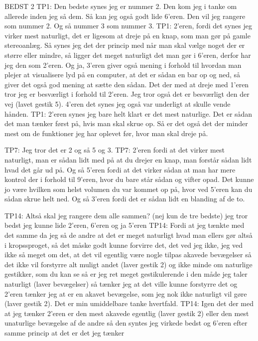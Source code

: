 BEDST 2
TP1: Den bedste synes jeg er nummer 2. Den kom jeg i tanke om allerede inden jeg så dem. Så kan jeg også godt lide 6’eren. Den vil jeg rangere som nummer 2. Og så nummer 3 som nummer 3.
TP1: 2’eren, fordi det synes jeg virker mest naturligt, det er ligesom at dreje på en knap, som man gør på gamle stereoanlæg. Så synes jeg det der princip med når man skal vælge noget der er større eller mindre, så ligger det meget naturligt det man gør i 6’eren, derfor har jeg den som 2’eren. Og ja, 3’eren giver også mening i forhold til hvordan man plejer at visualisere lyd på en computer, at det er sådan en bar op og ned, så giver det også god mening at sætte den sådan. Det der med at dreje med 1’eren tror jeg er besværligt i forhold til 2’eren. Jeg tror også det er besværligt den der vej (lavet gestik 5). 4’eren det synes jeg også var underligt at skulle vende hånden. 
TP1: 2’eren synes jeg bare helt klart er det mest naturlige. Det er sådan det man tænker først på, hvis man skal skrue op. Så er det også det der minder mest om de funktioner jeg har oplevet før, hvor man skal dreje på.

TP7:  Jeg tror det er 2 og så 5 og 3. 
TP7: 2’eren fordi at det virker mest naturligt, man er sådan lidt med på at du drejer en knap, man forstår sådan lidt hvad det går ud på. Og så 5’eren fordi at det virker sådan at man har mere kontrol der i forhold til 9’eren, hvor du bare står sådan og vifter opad. Det kunne jo være hvilken som helst volumen du var kommet op på, hvor ved 5’eren kan du sådan skrue helt ned. Og så 3’eren fordi det er sådan lidt en blanding af de to. 

TP14: Altså skal jeg rangere dem alle sammen? (nej kun de tre bedste) jeg tror bedst jeg kunne lide 2’eren, 6’eren og ja 5’eren
TP14: Fordi at jeg tænkte med det samme da jeg så de andre at det er meget naturligt hvad man ellers gør altså i kropssproget, så det måske godt kunne forvirre det, det ved jeg ikke, jeg ved ikke så meget om det, at det vil egentlig være nogle tilpas akavede bevægelser så det ikke vil forstyrre alt muligt andet (laver gestik 2) og ikke minde om naturlige gestikker, som du kan se så er jeg ret meget gestikulerende i den måde jeg taler naturligt (laver bevægelser) så tænker jeg at det ville kunne forstyrre det og 2’eren tænker jeg at er en akavet bevægelse, som jeg nok ikke naturligt vil gøre (laver gestik 2). Det er min umiddelbare tanke hvertfald.  
TP14: Igen det der med at jeg tænker 2’eren er den mest akavede egentlig (laver gestik 2) eller den mest unaturlige bevægelse af de andre så den syntes jeg virkede bedst og 6’eren efter samme princip at det er det jeg tænker

